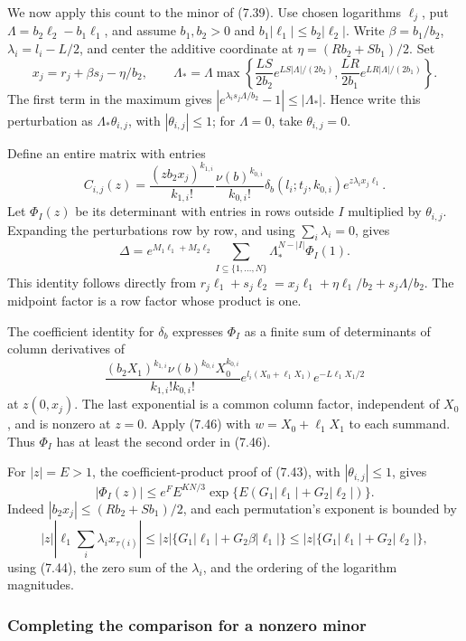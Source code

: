 \documentclass[
  11pt,
  a4paper,
]{article}
\begin{document}
We now apply this count to the minor of (7.39). Use chosen logarithms
\(\ell_j\), put \(\Lambda=b_2\ell_2-b_1\ell_1\), and assume
\(b_1,b_2>0\) and \(b_1|\ell_1|\le b_2|\ell_2|\). Write
\(\beta=b_1/b_2\), \(\lambda_i=l_i-L/2\), and center the additive
coordinate at \(\eta=(Rb_2+Sb_1)/2\). Set \[
x_j=r_j+\beta s_j-\eta/b_2,\qquad
\Lambda_* =\Lambda\max\left\{
\frac{LS}{2b_2}e^{LS|\Lambda|/(2b_2)},
\frac{LR}{2b_1}e^{LR|\Lambda|/(2b_1)}\right\}.
\] The first term in the maximum gives
\(|e^{\lambda_i s_j\Lambda/b_2}-1|\le|\Lambda_*|\). Hence write this
perturbation as \(\Lambda_*\theta_{i,j}\), with \(|\theta_{i,j}|\le1\);
for \(\Lambda=0\), take \(\theta_{i,j}=0\).

Define an entire matrix with entries \[
C_{i,j}(z)=\frac{(zb_2x_j)^{k_{1,i}}}{k_{1,i}!}
\frac{\nu(b)^{k_{0,i}}}{k_{0,i}!}
\delta_b(l_i;t_j,k_{0,i})e^{z\lambda_i x_j\ell_1}.
\] Let \(\Phi_I(z)\) be its determinant with entries in rows outside
\(I\) multiplied by \(\theta_{i,j}\). Expanding the perturbations row by
row, and using \(\sum_i\lambda_i=0\), gives \[
\Delta=e^{M_1\ell_1+M_2\ell_2}
\sum_{I\subseteq\{1,\ldots,N\}}\Lambda_*^{N-|I|}\Phi_I(1).
\] This identity follows directly from
\(r_j\ell_1+s_j\ell_2=x_j\ell_1+\eta\ell_1/b_2+s_j\Lambda/b_2\). The
midpoint factor is a row factor whose product is one.

The coefficient identity for \(\delta_b\) expresses \(\Phi_I\) as a
finite sum of determinants of column derivatives of \[
\frac{(b_2X_1)^{k_{1,i}}\nu(b)^{k_{0,i}}X_0^{k_{0,i}}}
{k_{1,i}!k_{0,i}!}
e^{l_i(X_0+\ell_1X_1)}e^{-L\ell_1X_1/2}
\] at \(z(0,x_j)\). The last exponential is a common column factor,
independent of \(X_0\), and is nonzero at \(z=0\). Apply (7.46) with
\(w=X_0+\ell_1X_1\) to each summand. Thus \(\Phi_I\) has at least the
second order in (7.46).

For \(|z|=E>1\), the coefficient-product proof of (7.43), with
\(|\theta_{i,j}|\le1\), gives \[
|\Phi_I(z)|\le e^F E^{KN/3}
\exp\{E(G_1|\ell_1|+G_2|\ell_2|)\}. \tag{7.47}
\] Indeed \(|b_2x_j|\le(Rb_2+Sb_1)/2\), and each permutation's exponent
is bounded by \[
|z|\left|\ell_1\sum_i\lambda_i x_{\tau(i)}\right|
\le |z|\{G_1|\ell_1|+G_2\beta|\ell_1|\}
\le |z|\{G_1|\ell_1|+G_2|\ell_2|\},
\] using (7.44), the zero sum of the \(\lambda_i\), and the ordering of
the logarithm magnitudes.

\subsubsection{Completing the comparison for a nonzero
minor}\label{completing-the-comparison-for-a-nonzero-minor}
\end{document}
